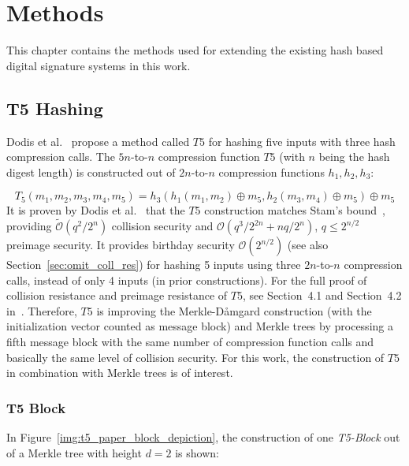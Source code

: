 \chapter{Methods}
\label{cha:methods}
This chapter contains the methods used for extending the existing hash based digital signature systems in this work.

\section{T5 Hashing}
Dodis et al.~\cite{T5_paper} propose a method called $T5$ for hashing five inputs with three hash compression calls. The $5n$-to-$n$ compression function $T5$ (with $n$ being the hash digest length) is constructed out of $2n$-to-$n$ compression functions $h_1, h_2, h_3$:

\begin{equation}
\label{eq:t5_basic}
T_5(m_1, m_2, m_3, m_4, m_5) = h_3(h_1(m_1,m_2) \oplus m_5, h_2(m_3,m_4) \oplus m_5) \oplus m_5
\end{equation}
It is proven by Dodis et al.~\cite{T5_paper} that the $T5$ construction matches Stam’s bound~\cite{stams_bound2008}, providing $\tilde{\mathcal{O}}(q^2/2^n)$ collision security and $\mathcal{O}(q^3/2^{2n}+nq/2^n)$, $q \leq 2^{n/2}$ preimage security. It provides birthday security $\mathcal{O}(2^{n/2})$ (see also Section~\ref{sec:omit_coll_res}) for hashing 5 inputs using three $2n$-to-$n$ compression calls, instead of only 4 inputs (in prior constructions). For the full proof of collision resistance and preimage resistance of $T5$, see Section~4.1 and Section~4.2 in~\cite{T5_paper}. %
Therefore, $T5$ is improving the Merkle-D\aa mgard construction (with the initialization vector counted as message block) and Merkle trees by processing a fifth message block with the same number of compression function calls and basically the same level of collision security. 
For this work, the construction of $T5$ in combination with Merkle trees is of interest.  

\subsection{T5 Block}
\label{sec:t5_block}
In Figure~\ref{img:t5_paper_block_depiction}, the construction of one \textit{T5-Block} out of a Merkle tree with height $d=2$ is shown:

